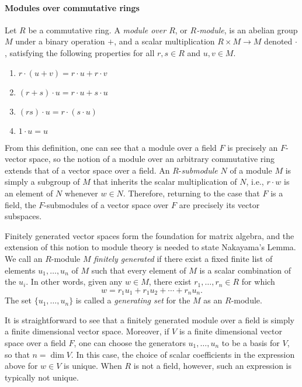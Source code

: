 \documentclass[referee,sn-mathphys]{sn-jnl}
\theoremstyle{definition}
\theoremstyle{remark}
\numberwithin{equation}{section}
\numberwithin{figure}{subsection}
\begin{document}

\paragraph{Modules over commutative rings}
Let  $R$ be a commutative ring. 
A \emph{module over $R$}, or \emph{$R$-module}, is an abelian group $M$ under a
binary operation $+$, and a {scalar multiplication} $R \times M \to M$ denoted
$\cdot$, satisfying the following properties for all $r, s \in R$
and $u, v \in M$.

\begin{enumerate}[leftmargin=5cm,topsep=0cm,itemsep=0cm]
  \item  $r \cdot (u + v)  = r \cdot u + r \cdot v$
  \item $(r+s) \cdot u = r \cdot u + s \cdot u$
  \item $(rs) \cdot u = r \cdot (s \cdot u)$
  \item $1 \cdot u = u$ 
\end{enumerate}

From this definition, one can see that a module over a field $F$ is precisely
an $F$-vector space, so the notion of a module over an arbitrary commutative
ring extends that of a vector space over a field. 
An $R$-\emph{submodule} $N$ of a module $M$ is simply a subgroup of $M$ that inherits 
the scalar multiplication of $N$, i.e., $r \cdot w$ is an element of $N$ whenever $w \in N$.
Therefore, returning to the case that $F$ is a field,
the $F$-submodules of a vector space over $F$ are precisely its vector subspaces. 


Finitely generated vector spaces form the foundation for matrix algebra, and the extension of this notion
to module theory is needed to state Nakayama's Lemma. We call an $R$-module
$M$ \emph{finitely generated} if there exist a fixed finite list of elements
$u_1, \ldots, u_n$ of $M$ such that every element of $M$ is a scalar combination 
of the $u_i$.  In other words, 
given any  $w \in M$,
there exist $r_1, \ldots, r_n \in R$ for which  
\[w = r_1 u_1 + r_1 u_2 + \cdots + r_n u_n\text{.}\]
The set $\{u_1, \ldots, u_n\}$ is called a \emph{generating set} for the $M$ as
an $R$-module. 

It is straightforward to see that a finitely generated module over a field is  
simply a finite dimensional vector space.
Moreover, if $V$ is a finite dimensional vector space over a field 
$F$, one can choose the generators $u_1, \ldots, u_n$ to be a basis for $V$, so that  
$n = \dim V$. In this case, the choice of scalar coefficients in the expression
above for $w \in V$ is unique. When $R$ is not a field, however, such an
expression is typically not unique. 
\end{document}
